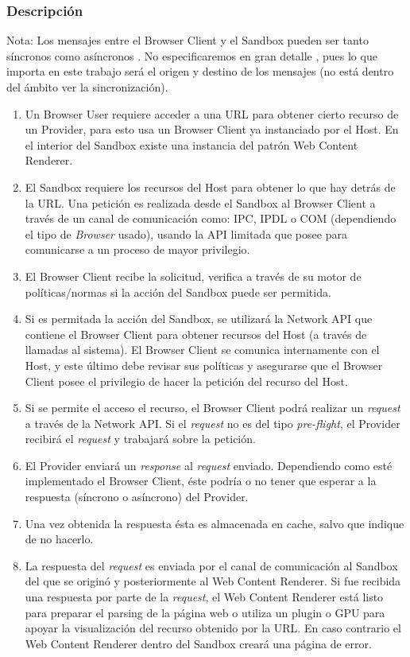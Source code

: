 \documentclass{sig-alternate-05-2015}
\begin{document}
    \subsubsection*{Descripción}
    Nota: Los mensajes entre el Browser Client y el Sandbox pueden ser tanto síncronos como asíncronos \cite{firefoxIPC,GCIPC}. No especificaremos en gran detalle , pues lo que importa en este trabajo será el origen y destino de los mensajes (no está dentro del ámbito ver la sincronización).
      \begin{enumerate}
        \item Un Browser User requiere acceder a una URL para obtener cierto recurso de un Provider, para esto usa un Browser Client ya instanciado por el Host. En el interior del Sandbox existe una instancia del patrón Web Content Renderer. 
        \item El Sandbox requiere los recursos del Host para obtener lo que hay detrás de la URL. Una petición es realizada desde el Sandbox al Browser Client a través de un canal de comunicación como: IPC, IPDL o COM (dependiendo el tipo de \textit{Browser} usado), usando la API limitada que posee para comunicarse a un proceso de mayor privilegio. 
        \item El Browser Client recibe la solicitud, verifica a través de su motor de políticas/normas si la acción del Sandbox puede ser permitida.
        \item Si es permitada la acción del Sandbox, se utilizará la Network API que contiene el Browser Client para obtener recursos del Host (a través de llamadas al sistema). El Browser Client se comunica internamente con el Host, y este último debe revisar sus políticas y asegurarse que el Browser Client posee el privilegio de hacer la petición del recurso del Host.
        \item Si se permite el acceso el recurso, el Browser Client podrá realizar un \textit{request} a través de la Network API. Si el \textit{request} no es del tipo \textit{pre-flight}, el Provider recibirá el \textit{request} y trabajará sobre la petición.
        \item El Provider enviará un \textit{response} al \textit{request} enviado. Dependiendo como esté implementado el Browser Client, éste podría o no tener que esperar a la respuesta (síncrono o asíncrono) del Provider.
        \item Una vez obtenida la respuesta ésta es almacenada en cache, salvo que indique de no hacerlo.
        \item La respuesta del \textit{request} es enviada por el canal de comunicación al Sandbox del que se originó y posteriormente al Web Content Renderer. Si fue recibida una respuesta por parte de la \textit{request}, el Web Content Renderer está listo para preparar el parsing de la página web o utiliza un plugin o GPU para apoyar la visualización del recurso obtenido por la URL. En caso contrario el Web Content Renderer dentro del Sandbox creará una página de error.

\end{enumerate}
\end{document}
